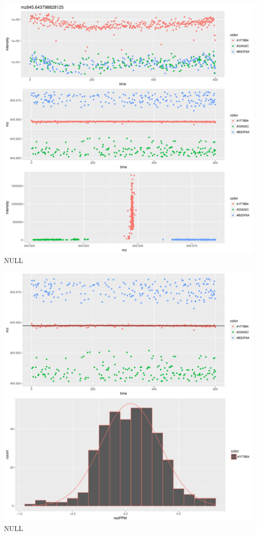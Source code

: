 \documentclass[]{article}
\begin{document}
\includegraphics{Supplementary_document_files/figure-latex/cluster.mz.845-1.pdf}
NULL

\includegraphics{Supplementary_document_files/figure-latex/filter.lm.845-1.pdf}
NULL
\end{document}
